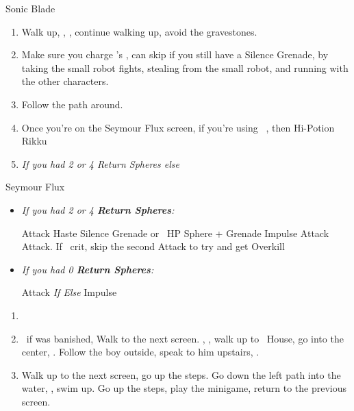 \begin{multicols}{2}
\begin{equip}
	\begin{itemize}
		\auronf Sonic Blade
	\end{itemize}
\end{equip}
\begin{enumerate}[resume]
	\item Walk up, \sd, \cs[1:20], continue walking up, avoid the gravestones.
	\item Make sure you charge \rikku's \od, can skip if you still have a Silence Grenade, by taking the small robot fights, stealing from the small robot, and running with the other characters.
	\item Follow the path around.
	\item Once you're on the Seymour Flux screen, if you're using \rikku\ \od, then Hi-Potion Rikku
	\item \formation{\tidus}{\yuna}{\auron} \textit{If you had 2 or 4 Return Spheres else } \formation{\tidus}{\kimahri}{\wakka}
\end{enumerate}
\begin{battle}[70000]{Seymour Flux}
	\begin{itemize}
		\item \textit{If you had 2 or 4 \textbf{Return Spheres}:}
		      \begin{itemize}
			      \yunaf Attack
			      \tidusf Haste \yuna
			      \switch{\auron}{\rikku}
			      \rikkuf Silence Grenade or \od\ HP Sphere + Grenade
			      \summon{\bahamut}
			      \bahamutf Impulse
			      \yunaf Attack
			      \tidusf Attack. If \yuna\ crit, skip the second Attack to try and get Overkill
		      \end{itemize}
		\item \textit{If you had 0 \textbf{Return Spheres}:}
		      \begin{itemize}
			      \switch{\tidus}{\yuna}
			      \summon{\bahamut}
			      \bahamutf Attack \textit{If \blitzwin Else} Impulse
		      \end{itemize}
	\end{itemize}
\end{battle}
\begin{enumerate}[resume]
	\item \formation{\tidus}{\kimahri}{\auron}
	\item \save\ if \bahamut was banished, Walk to the next screen. \skippablefmv[0:20], \sd, walk up to \tidus\ House, go into the center, \sd. Follow the boy outside, speak to him upstairs, \sd.
	\item Walk up to the next screen, go up the steps. Go down the left path into the water, \sd, swim up. Go up the steps, play the minigame, return to the previous screen.

\end{enumerate}
\end{multicols}
